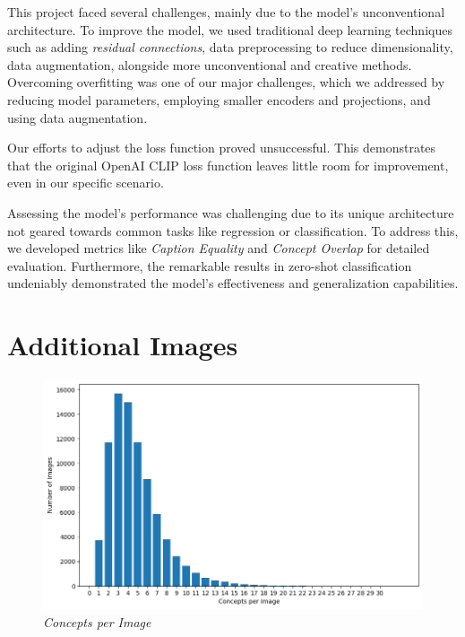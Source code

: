 \documentclass[10pt,twocolumn,letterpaper]{article}
\begin{document}
This project faced several challenges, mainly due to the model's unconventional architecture. 
To improve the model, we used traditional deep learning techniques such as adding \textit{residual connections}, data preprocessing to reduce dimensionality, data augmentation, alongside more unconventional and creative methods.
Overcoming overfitting was one of our major challenges, which we addressed by reducing model parameters, employing smaller encoders and projections, and using data augmentation. 

Our efforts to adjust the loss function proved unsuccessful. This demonstrates that the original OpenAI CLIP loss function leaves little room for improvement, even in our specific scenario.

Assessing the model's performance was challenging due to its unique architecture not geared towards common tasks like regression or classification.
To address this, we developed metrics like \textit{Caption Equality} and \textit{Concept Overlap} for detailed evaluation. 
Furthermore, the remarkable results in zero-shot classification undeniably demonstrated the model's effectiveness and generalization capabilities.

\appendix
\section{Additional Images}
\begin{figure}[H]
   \centering
   \includegraphics[width=1\linewidth]{img/Data_Exploration_2.png}
   \caption{\textit{Concepts per Image}}
   \label{fig:cpi}
\end{figure}
\end{document}
